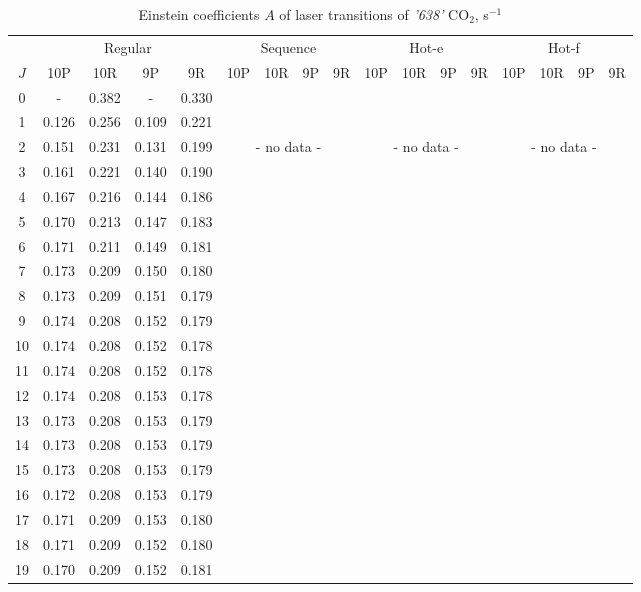 \documentclass{report}
\begin{document}
\begin{table}
\centering
\caption{Einstein coefficients $A$ of laser transitions of \textit{'638'} CO$_2$, s$^{-1}$}
\scriptsize
\begin{tabular}{|c|cccc|cccc|cccc|cccc|}
\hline
& \multicolumn{4}{c|}{Regular}& \multicolumn{4}{c|}{Sequence}& \multicolumn{4}{c|}{Hot-e}& \multicolumn{4}{c|}{Hot-f}\\
$J$ & 10P & 10R & 9P & 9R & 10P & 10R & 9P & 9R & 10P & 10R & 9P & 9R & 10P & 10R & 9P & 9R\\ 
\hline
0  &   -   & 0.382 &   -   & 0.330 & & & & & & & & & & & &\\
1  & 0.126 & 0.256 & 0.109 & 0.221 & & & & & & & & & & & &\\
2  & 0.151 & 0.231 & 0.131 & 0.199 & \multicolumn{4}{c|}{- no data -}& \multicolumn{4}{c|}{- no data -}& \multicolumn{4}{c|}{- no data -}\\
3  & 0.161 & 0.221 & 0.140 & 0.190 & & & & & & & & & & & &\\
4  & 0.167 & 0.216 & 0.144 & 0.186 & & & & & & & & & & & &\\
5  & 0.170 & 0.213 & 0.147 & 0.183 & & & & & & & & & & & &\\
6  & 0.171 & 0.211 & 0.149 & 0.181 & & & & & & & & & & & &\\
7  & 0.173 & 0.209 & 0.150 & 0.180 & & & & & & & & & & & &\\
8  & 0.173 & 0.209 & 0.151 & 0.179 & & & & & & & & & & & &\\
9  & 0.174 & 0.208 & 0.152 & 0.179 & & & & & & & & & & & &\\
10 & 0.174 & 0.208 & 0.152 & 0.178 & & & & & & & & & & & &\\
11 & 0.174 & 0.208 & 0.152 & 0.178 & & & & & & & & & & & &\\
12 & 0.174 & 0.208 & 0.153 & 0.178 & & & & & & & & & & & &\\
13 & 0.173 & 0.208 & 0.153 & 0.179 & & & & & & & & & & & &\\
14 & 0.173 & 0.208 & 0.153 & 0.179 & & & & & & & & & & & &\\
15 & 0.173 & 0.208 & 0.153 & 0.179 & & & & & & & & & & & &\\
16 & 0.172 & 0.208 & 0.153 & 0.179 & & & & & & & & & & & &\\
17 & 0.171 & 0.209 & 0.153 & 0.180 & & & & & & & & & & & &\\
18 & 0.171 & 0.209 & 0.152 & 0.180 & & & & & & & & & & & &\\
19 & 0.170 & 0.209 & 0.152 & 0.181 & & & & & & & & & & & &\\

\end{tabular}
\end{table}
\end{document}
